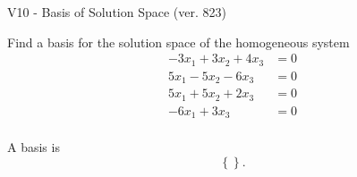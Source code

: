 \begin{exercise}
  \begin{exerciseTitle}V10 - Basis of Solution Space (ver. 823)\end{exerciseTitle}
  \begin{exerciseStatement}
    Find a basis for the solution space of the homogeneous system 
\begin{align*}
 -3 x_ 1 + 3 x_ 2 + 4 x_ 3 &= 0  \\ 
  5 x_ 1 -5 x_ 2 -6 x_ 3 &= 0  \\ 
  5 x_ 1 + 5 x_ 2 + 2 x_ 3 &= 0  \\ 
  -6 x_ 1 + 3 x_ 3 &= 0  \\ 
 \end{align*}


 
  \end{exerciseStatement}

  \begin{exerciseAnswer}
   A basis is   
\[\left\{\right\}.\]

  


  \end{exerciseAnswer}
\end{exercise}